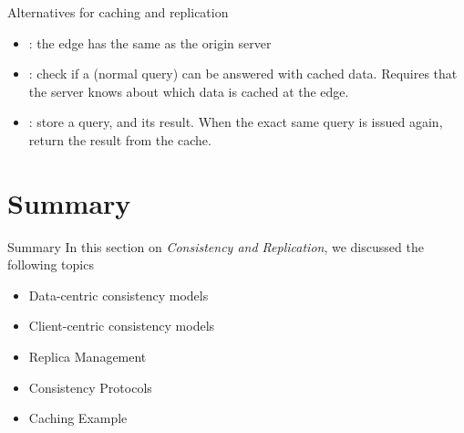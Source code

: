 \begin{slide}{Alternatives for caching and replication}
  \vspace*{-6pt}
  \begin{centerfig}
  \end{centerfig}
  \begin{itemize}\tightlist
  \item {}: the edge has the same as the origin server
  \item {}: check if a (normal query) can be answered with cached data. Requires that
    the server knows about which data is cached at the edge.
  \item {}: store a query, and its result. When the exact same query is issued again,
    return the result from the cache.
  \end{itemize}
\end{slide}
\section{Summary}
\begin{slide}{Summary}
In this section on \emph{Consistency and Replication},
we discussed the following topics  
  \begin{itemize}\tightlist
  \item Data-centric consistency models
  \item Client-centric consistency models
  \item Replica Management
  \item Consistency Protocols
  \item Caching Example
  \end{itemize}
\end{slide}
